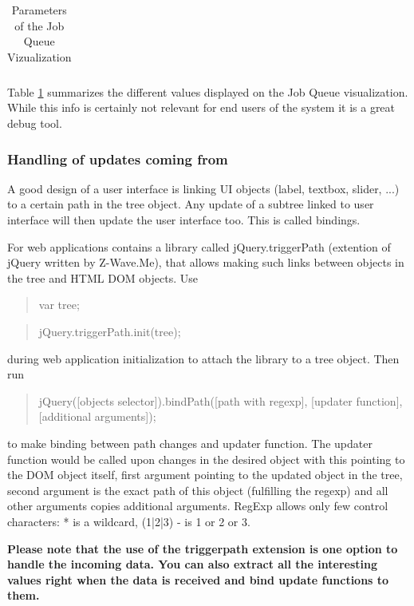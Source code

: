 \begin{table}
\begin{tabular}{|p{}|p{}|}
\hline
\end{tabular}
\caption{Parameters of the Job Queue Vizualization}
\label{c1:queuecommands}
\end{table}

Table \ref{c1:queuecommands} summarizes the different values displayed on the Job Queue 
visualization. While this info is certainly not relevant for end users of the system it 
is a great debug tool.

\subsubsection{Handling of updates coming from \zway}

A good design of a user interface is linking UI objects (label, textbox, slider, ...) to a certain 
path in the tree object. Any update of a subtree linked to user interface will then update the user interface
too. This is called bindings.

For web applications \zway contains a library called jQuery.triggerPath (extention of 
jQuery written by Z-Wave.Me), that allows making such links between objects in the 
tree and HTML DOM objects. Use

\begin{quote}var tree;\end{quote}
\begin{quote}jQuery.triggerPath.init(tree);\end{quote}

during web application initialization to attach the library to a tree object. Then run

\begin{quote}jQuery([objects selector]).bindPath([path with regexp], [updater function],
[additional arguments]);\end{quote}

to make binding between path changes and updater function. The updater function would be 
called upon changes in the desired object with this pointing to the DOM object itself, 
first argument pointing to the updated object in the tree, second argument is the exact 
path of this object (fulfilling the regexp) and all other arguments copies additional 
arguments. RegExp allows only few control characters: * is a wildcard, (1|2|3) - is 1 or 2 or 3.

\textbf{Please note that the use of the triggerpath extension is one option to handle 
the incoming data. You can also extract all the interesting values right when the 
data is received and bind update functions to them.}


